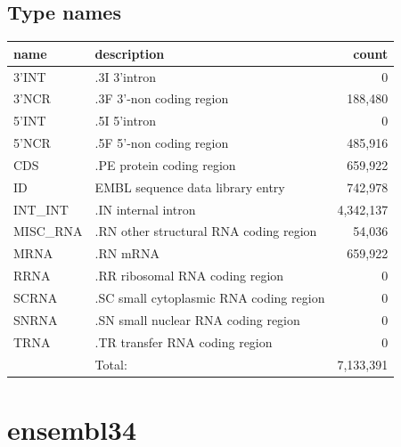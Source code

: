 \documentclass{article}
\begin{document}
\begin{Schunk}
\subsection{Type names}
\noindent\begin{tabular}{llr}
\hline \hline
name & description & count \\
\hline
3'INT  &  .3I 3'intron  &  0 \\
3'NCR  &  .3F  3'-non coding region  &  188,480 \\
5'INT  &  .5I 5'intron  &  0 \\
5'NCR  &  .5F  5'-non coding region  &  485,916 \\
CDS  &  .PE protein coding region  &  659,922 \\
ID  &  EMBL sequence data library entry  &  742,978 \\
INT\_INT  &  .IN  internal intron  &  4,342,137 \\
MISC\_RNA  &  .RN other structural RNA coding region  &  54,036 \\
MRNA  &  .RN mRNA  &  659,922 \\
RRNA  &  .RR ribosomal RNA coding region  &  0 \\
SCRNA  &  .SC small cytoplasmic RNA coding region  &  0 \\
SNRNA  &  .SN small nuclear RNA coding region  &  0 \\
TRNA  &  .TR transfer RNA coding region  &  0 \\
\hline
 & Total: & 7,133,391 \\
\hline \hline
\end{tabular}

\section{ ensembl34 }

\end{Schunk}
\end{document}
